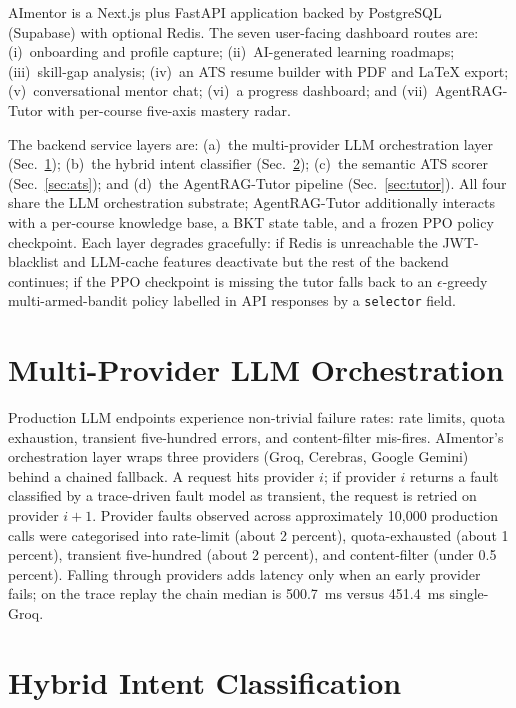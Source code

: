 \documentclass[conference]{IEEEtran}
\begin{document}
AImentor is a Next.js plus FastAPI application backed by PostgreSQL
(Supabase) with optional Redis. The seven user-facing dashboard
routes are: (i)~onboarding and profile capture; (ii)~AI-generated
learning roadmaps; (iii)~skill-gap analysis; (iv)~an ATS resume
builder with PDF and LaTeX export; (v)~conversational mentor chat;
(vi)~a progress dashboard; and (vii)~AgentRAG-Tutor with per-course
five-axis mastery radar.

The backend service layers are: (a)~the multi-provider LLM
orchestration layer (Sec.~\ref{sec:llm}); (b)~the hybrid intent
classifier (Sec.~\ref{sec:intent}); (c)~the semantic ATS scorer
(Sec.~\ref{sec:ats}); and (d)~the AgentRAG-Tutor pipeline
(Sec.~\ref{sec:tutor}). All four share the LLM orchestration
substrate; AgentRAG-Tutor additionally interacts with a per-course
knowledge base, a BKT state table, and a frozen PPO policy checkpoint.
Each layer degrades gracefully: if Redis is unreachable the
JWT-blacklist and LLM-cache features deactivate but the rest of the
backend continues; if the PPO checkpoint is missing the tutor falls
back to an $\epsilon$-greedy multi-armed-bandit policy labelled in
API responses by a \texttt{selector} field.

\section{Multi-Provider LLM Orchestration}\label{sec:llm}

Production LLM endpoints experience non-trivial failure rates: rate
limits, quota exhaustion, transient five-hundred errors, and
content-filter mis-fires. AImentor's orchestration layer wraps three
providers (Groq, Cerebras, Google Gemini) behind a chained fallback.
A request hits provider $i$; if provider $i$ returns a fault classified
by a trace-driven fault model as transient, the request is retried on
provider $i+1$. Provider faults observed across approximately 10{,}000
production calls were categorised into rate-limit (about 2 percent),
quota-exhausted (about 1 percent), transient five-hundred (about 2
percent), and content-filter (under 0.5 percent). Falling through
providers adds latency only when an early provider fails; on the
trace replay the chain median is 500.7~ms versus 451.4~ms single-Groq.

\section{Hybrid Intent Classification}\label{sec:intent}
\end{document}

